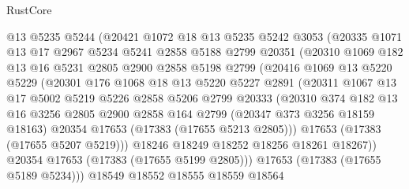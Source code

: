 \begin{lexlean}{RustCore}
\begin{coremodule}
              @13
              @5235
              @5244
              (@20421
                @1072
                @18
                @13
                @5235
                @5242
                @3053
                (@20335
                  @1071
                  @13
                  @17
                  @2967
                  @5234
                  @5241
                  @2858
                  @5188
                  @2799
                  @20351
                  (@20310
                    @1069
                    @182
                    @13
                    @16
                    @5231
                    @2805
                    @2900
                    @2858
                    @5198
                    @2799
                    (@20416
                      @1069
                      @13
                      @5220
                      @5229
                      (@20301
                        @176
                        @1068
                        @18
                        @13
                        @5220
                        @5227
                        @2891
                        (@20311
                          @1067
                          @13
                          @17
                          @5002
                          @5219
                          @5226
                          @2858
                          @5206
                          @2799
                          @20333
                          (@20310
                            @374
                            @182
                            @13
                            @16
                            @3256
                            @2805
                            @2900
                            @2858
                            @164
                            @2799
                            (@20347 @373 @3256 @18159 @18163)
                            @20354
                            @17653
                            (@17383 (@17655 @5213 @2805)))
                          @17653
                          (@17383 (@17655 @5207 @5219)))
                        @18246
                        @18249
                        @18252
                        @18256
                        @18261
                        @18267))
                    @20354
                    @17653
                    (@17383 (@17655 @5199 @2805)))
                  @17653
                  (@17383 (@17655 @5189 @5234)))
                @18549
                @18552
                @18555
                @18559
                @18564

\end{coremodule}
\end{lexlean}
